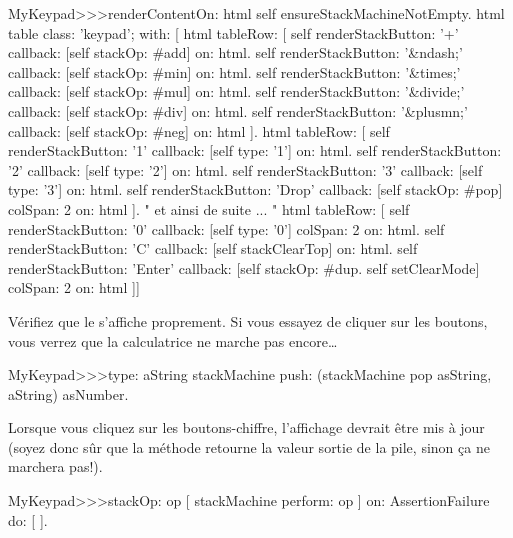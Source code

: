 \documentclass[a4paper,10pt,twoside]{book}
\begin{document}
\begin{code}{}
MyKeypad>>>renderContentOn: html 
  self ensureStackMachineNotEmpty.
  html table
    class: 'keypad';
    with: [
      html tableRow: [
          self renderStackButton: '+' callback: [self stackOp: #add] on: html.
          self renderStackButton: '&ndash;' callback: [self stackOp: #min] on: html.
          self renderStackButton: '&times;' callback: [self stackOp: #mul] on: html.
          self renderStackButton: '&divide;' callback: [self stackOp: #div] on: html.
          self renderStackButton: '&plusmn;' callback: [self stackOp: #neg] on: html ].
        html tableRow: [
          self renderStackButton: '1' callback: [self type: '1'] on: html.
          self renderStackButton: '2' callback: [self type: '2'] on: html.
          self renderStackButton: '3' callback: [self type: '3'] on: html.
          self renderStackButton: 'Drop' callback: [self stackOp: #pop]
          	colSpan: 2 on: html ].
" et ainsi de suite ... "
        html tableRow: [
          self renderStackButton: '0' callback: [self type: '0'] colSpan: 2 on: html.
          self renderStackButton: 'C' callback: [self stackClearTop] on: html.
          self renderStackButton: 'Enter'
          	callback: [self stackOp: #dup. self setClearMode]
			colSpan: 2 on: html ]]
\end{code}

Vérifiez que le  s'affiche proprement.
Si vous essayez de cliquer sur les boutons, vous verrez que la
calculatrice ne marche pas encore\ldots{}

\begin{code}{}
MyKeypad>>>type: aString
	stackMachine push: (stackMachine pop asString, aString) asNumber.
\end{code}
Lorsque vous cliquez sur les boutons-chiffre, l'affichage devrait être
mis à jour
(soyez donc sûr que la méthode  retourne la
valeur sortie de la pile, sinon ça ne marchera pas!).



\begin{code}{}
MyKeypad>>>stackOp: op
	[ stackMachine perform: op ] on: AssertionFailure do: [ ].
\end{code}
\end{document}
